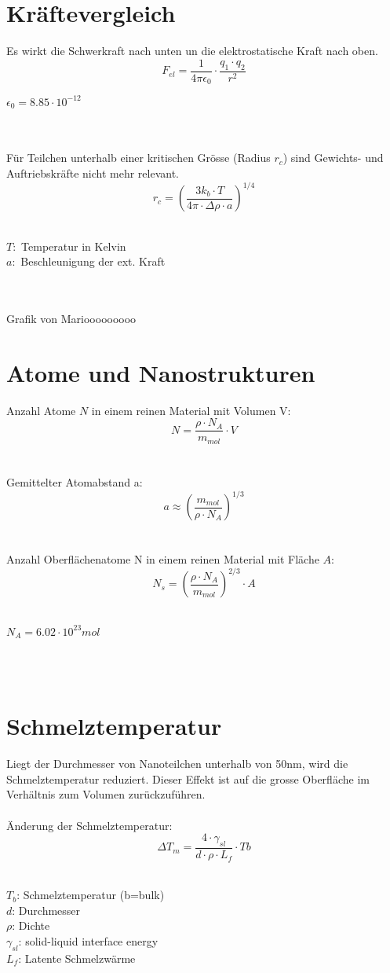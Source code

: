 \section{Kräftevergleich}
Es wirkt die Schwerkraft nach unten un die elektrostatische Kraft nach oben.\\
\[
	F_{el}=\frac{1}{4\pi\epsilon_0} \cdot \frac{q_1 \cdot q_2}{r^2}
\]
\begin{footnotesize}
	$\epsilon_0 = 8.85\cdot 10^{-12}$
\end{footnotesize}
\\
\\
Für Teilchen unterhalb einer kritischen Grösse (Radius $r_c$) sind Gewichts- und Auftriebskräfte nicht mehr relevant.
\[
	r_c=\left( \frac{3 k_b\cdot T}{4\pi\cdot\Delta \rho \cdot a}\right) ^{1/4}
\]
\\
\begin{footnotesize}
	$T:$ Temperatur in Kelvin\\
	$a:$ Beschleunigung der ext. Kraft
\end{footnotesize}
\\
\\
Grafik von Mariooooooooo
\\
\section{Atome und Nanostrukturen}
Anzahl Atome $N$ in einem reinen Material mit Volumen V:
\[
	N=\frac{\rho\cdot N_A}{m_{mol}} \cdot V
\]
\\
\\
Gemittelter Atomabstand a:
\[
	a \approx \left( \frac{m_{mol}}{\rho\cdot N_A}\right) ^{1/3}
\]
\\
\\
Anzahl Oberflächenatome N in einem reinen Material mit Fläche $A$:
\[
	N_s=\left( \frac{\rho\cdot N_A}{m_{mol}}\right) ^{2/3}\cdot A
\]
\\
\begin{footnotesize}
	$N_A=6.02\cdot 10^{23} mol$
\end{footnotesize}
\\
\\
\section{Schmelztemperatur}
Liegt der Durchmesser von Nanoteilchen unterhalb von 50nm, wird die Schmelztemperatur reduziert. Dieser Effekt ist auf die grosse Oberfläche im Verhältnis zum Volumen zurückzuführen.\\
\\
Änderung der Schmelztemperatur:
\[
	\Delta T_m=\frac{4\cdot \gamma_{sl}}{d \cdot \rho \cdot L_f} \cdot Tb
\]
\\
\begin{footnotesize}
	$T_b$: Schmelztemperatur (b=bulk)\\
	$d$: Durchmesser\\
	$\rho$: Dichte\\
	$\gamma_{sl}$: solid-liquid interface energy\\
	$L_f$: Latente Schmelzwärme\\
\end{footnotesize}